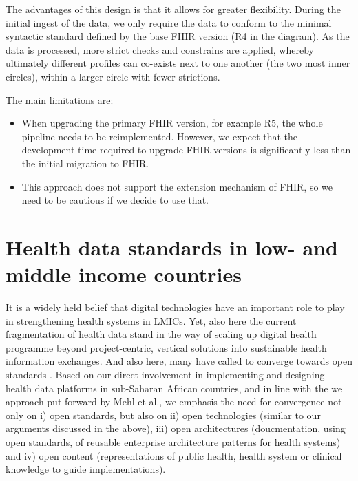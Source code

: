 \documentclass[
  authoryear]{elsarticle}
\providecommand{\tightlist}{%
  \setlength{\itemsep}{0pt}\setlength{\parskip}{0pt}}\usepackage{longtable,booktabs,array}
\begin{document}
The advantages of this design is that it allows for greater flexibility.
During the initial ingest of the data, we only require the data to
conform to the minimal syntactic standard defined by the base FHIR
version (R4 in the diagram). As the data is processed, more strict
checks and constrains are applied, whereby ultimately different profiles
can co-exists next to one another (the two most inner circles), within a
larger circle with fewer strictions.

The main limitations are:

\begin{itemize}
\tightlist
\item
  When upgrading the primary FHIR version, for example R5, the whole
  pipeline needs to be reimplemented. However, we expect that the
  development time required to upgrade FHIR versions is significantly
  less than the initial migration to FHIR.
\item
  This approach does not support the extension mechanism of FHIR, so we
  need to be cautious if we decide to use that.
\end{itemize}

\section{Health data standards in low- and middle income
countries}\label{health-data-standards-in-low--and-middle-income-countries}

It is a widely held belief that digital technologies have an important
role to play in strengthening health systems in LMICs. Yet, also here
the current fragmentation of health data stand in the way of scaling up
digital health programme beyond project-centric, vertical solutions into
sustainable health information exchanges. And also here, many have
called to converge towards open standards \citep{mehl2023fullstac}.
Based on our direct involvement in implementing and designing health
data platforms in sub-Saharan African countries, and in line with the we
approach put forward by Mehl et al., we emphasis the need for
convergence not only on i) open standards, but also on ii) open
technologies (similar to our arguments discussed in the above), iii)
open architectures (doucmentation, using open standards, of reusable
enterprise architecture patterns for health systems) and iv) open
content (representations of public health, health system or clinical
knowledge to guide implementations).
\end{document}

